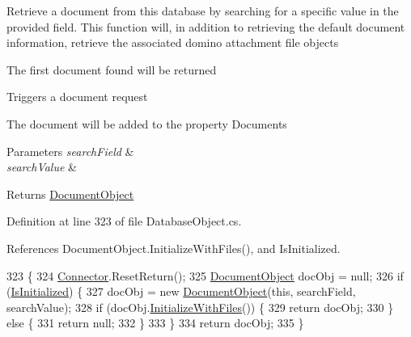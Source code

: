 Retrieve a document from this database by searching for a specific value in the provided field. This function will, in addition to retrieving the default document information, retrieve the associated domino attachment file objects 

The first document found will be returned

Triggers a document request

The document will be added to the property \textquotesingle{}Documents\textquotesingle{}


\begin{DoxyParams}{Parameters}
{\em search\+Field} & \\
\hline
{\em search\+Value} & \\
\hline
\end{DoxyParams}
\begin{DoxyReturn}{Returns}
\mbox{\hyperlink{class_document_object}{Document\+Object}}
\end{DoxyReturn}


Definition at line 323 of file Database\+Object.\+cs.



References Document\+Object.\+Initialize\+With\+Files(), and Is\+Initialized.


\begin{DoxyCode}
323                                                                                            \{
324         \mbox{\hyperlink{class_connector}{Connector}}.ResetReturn();
325         \mbox{\hyperlink{class_document_object}{DocumentObject}} docObj = null;
326         \textcolor{keywordflow}{if} (\mbox{\hyperlink{class_database_object_a5fe036d32a30eb10d1b3f6a30263f740}{IsInitialized}}) \{
327             docObj = \textcolor{keyword}{new} \mbox{\hyperlink{class_document_object}{DocumentObject}}(\textcolor{keyword}{this}, searchField, searchValue);
328             \textcolor{keywordflow}{if} (docObj.\mbox{\hyperlink{class_document_object_a83f0e855adc5fb7afd02d2e34767f5c8}{InitializeWithFiles}}()) \{
329                 \textcolor{keywordflow}{return} docObj;
330             \} \textcolor{keywordflow}{else} \{
331                 \textcolor{keywordflow}{return} null;
332             \}
333         \}
334         \textcolor{keywordflow}{return} docObj;
335     \}
\end{DoxyCode}
\mbox{\label{class_database_object_ae5477aedfcd0d54b21017faa1389bc71}} 
